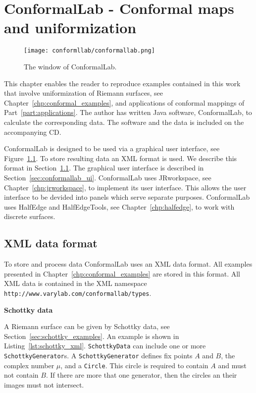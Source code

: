 \documentclass[Thesis.tex]{subfiles}
\begin{document}
\chapter{{\sc ConformalLab} - Conformal maps and uniformization}
\label{chp:conformallab}

\begin{figure}
\centering
\texttt{[image: conformllab/conformallab.png]}
\caption{The window of {\sc ConformalLab}.}
\label{fig:conformal_window}
\end{figure}

This chapter enables the reader to reproduce examples contained in this work that involve uniformization of
Riemann surfaces, see Chapter~\ref{chp:conformal_examples}, and applications of conformal mappings of 
Part~\ref{part:applications}. The author has written {\sc Java} software, {\sc ConformalLab}, to calculate the corresponding data.
The software and the data is included on the accompanying CD. 

{\sc ConformalLab} is designed to be used via a graphical user interface, see Figure~\ref{fig:conformal_window}. To store
resulting data an XML format is used. We describe this format in Section~\ref{sec:conformal_data}. The graphical user interface
is described in Section~\ref{sec:conformallab_ui}. {\sc ConformalLab} uses {\sc JRworkspace}, see Chapter~\ref{chp:jrworkspace}, to implement its user
interface. This allows the user interface to be devided into panels which serve separate purposes. 
{\sc ConformalLab} uses {\sc HalfEdge} and {\sc HalfEdgeTools}, see Chapter~\ref{chp:halfedge}, to work with discrete surfaces.


\section{XML data format}
\label{sec:conformal_data}
To store and process data {\sc ConformalLab} uses an {\sc XML} data format.
All examples presented in Chapter~\ref{chp:conformal_examples} are stored
in this format. 
All XML data is contained in the XML namespace 
{\tt http://www.varylab.com/conformallab/types}.


{\bf Schottky data} 

A Riemann surface can be given by Schottky data, see Section~\ref{sec:schottky_examples}. An example is shown in Listing~\ref{lst:schottky_xml}. {\tt SchottkyData} can include one or more {\tt SchottkyGenerator}s. A {\tt SchottkyGenerator} defines fix points $A$ and $B$, the complex number $\mu$, and a {\tt Circle}. This circle is required to contain $A$ and must not contain $B$. If there are more that one generator, then the circles
an their images must not intersect.
\end{document}
